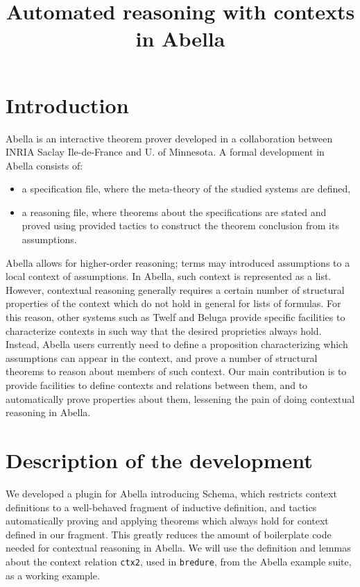 \documentclass[nocopyrightspace,authoryear]{sigplanconf}
\title{Automated reasoning with contexts in Abella}
\begin{document}
\maketitle
\section{Introduction}

Abella \cite{abellasys} is an interactive theorem prover developed in a collaboration between INRIA Saclay Ile-de-France and U. of Minnesota. A formal development in Abella consists of:
\begin{itemize}
\item a specification file, where the meta-theory of the studied systems are defined,
\item a reasoning file, where theorems about the specifications are stated and proved using provided tactics to construct the theorem conclusion from its assumptions.
\end{itemize}

Abella allows for higher-order reasoning; terms may introduced assumptions to a local context of assumptions. In Abella, such context is represented as a list. However, contextual reasoning generally requires a certain number of structural properties of the context which do not hold in general for lists of formulas. For this reason, other systems such as Twelf \cite{twelfsys} and Beluga \cite{belugasys} provide specific facilities to characterize contexts in such way that the desired proprieties always hold. Instead, Abella users currently need to define a proposition characterizing which assumptions can appear in the context, and prove a number of structural theorems to reason about members of such context. Our main contribution is to provide facilities to define contexts and relations between them, and to automatically prove properties about them, lessening the pain of doing contextual reasoning in Abella.



\section{Description of the development}

We developed a plugin for Abella introducing Schema, which restricts context definitions to a well-behaved fragment of inductive definition, and tactics automatically proving and applying theorems which always hold for context defined in our fragment. This greatly reduces the amount of boilerplate code needed for contextual reasoning in Abella. We will use the definition and lemmas about the context relation \lstinline|ctx2|, used in \lstinline|bredure|, from the Abella example suite, as a working example.
\end{document}
